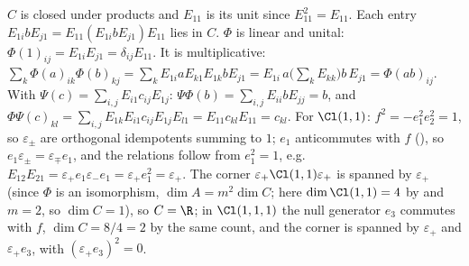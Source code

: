 $C$ is closed under products and $E_{11}$ is its unit since $E_{11}^{2} = E_{11}$. Each entry $E_{1i} b E_{j1} = E_{11}(E_{1i} b E_{j1})E_{11}$ lies in $C$. $\Phi$ is linear and unital: $\Phi(1)_{ij} = E_{1i}E_{j1} = \delta_{ij}E_{11}$. It is multiplicative: $\sum_k \Phi(a)_{ik}\Phi(b)_{kj} = \sum_k E_{1i} a E_{k1} E_{1k} b E_{j1} = E_{1i}\, a \bigl(\sum_k E_{kk}\bigr) b\, E_{j1} = \Phi(ab)_{ij}$. With $\Psi(c) = \sum_{i,j} E_{i1} c_{ij} E_{1j}$: $\Psi\Phi(b) = \sum_{i,j} E_{ii} b E_{jj} = b$, and $\Phi\Psi(c)_{kl} = \sum_{i,j} E_{1k}E_{i1}c_{ij}E_{1j}E_{l1} = E_{11}c_{kl}E_{11} = c_{kl}$. For $\Cl(1,1)$: $f^{2} = -e_1^{2}e_2^{2} = 1$, so $\varepsilon_\pm$ are orthogonal idempotents summing to $1$; $e_1$ anticommutes with $f$ (), so $e_1 \varepsilon_\pm = \varepsilon_\mp e_1$, and the relations follow from $e_1^{2} = 1$, e.g. $E_{12}E_{21} = \varepsilon_+ e_1 \varepsilon_- e_1 = \varepsilon_+ e_1^{2} = \varepsilon_+$. The corner $\varepsilon_+ \Cl(1,1) \varepsilon_+$ is spanned by $\varepsilon_+$ (since $\Phi$ is an isomorphism, $\dim A = m^{2} \dim C$; here $\dim \Cl(1,1) = 4$ by  and $m = 2$, so $\dim C = 1$), so $C = \R$; in $\Cl(1,1,1)$ the null generator $e_3$ commutes with $f$, $\dim C = 8/4 = 2$ by the same count, and the corner is spanned by $\varepsilon_+$ and $\varepsilon_+ e_3$, with $(\varepsilon_+ e_3)^{2} = 0$.
